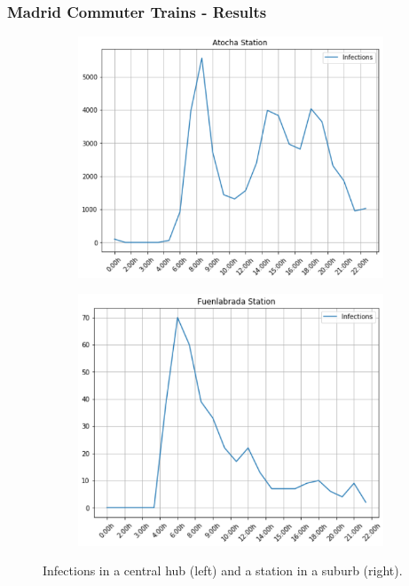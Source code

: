 \documentclass{beamer}
\begin{document}
\begin{frame}
\frametitle{Madrid Commuter Trains - Results}
\begin{figure}
	\centering
	\begin{subfigure}
		\centering
		\includegraphics[width=.4\linewidth]{Scratch_Visuals/madrid-infection-timeline-atocha.png}
	\end{subfigure}%
	\begin{subfigure}
		\centering
		\includegraphics[width=.4\linewidth]{Scratch_Visuals/madrid-infection-timeline-fuenlabrada.png}
	\end{subfigure}
	\caption{Infections in a central hub (left) and a station in a suburb (right).}
\end{figure}
\end{frame}
\end{document}
